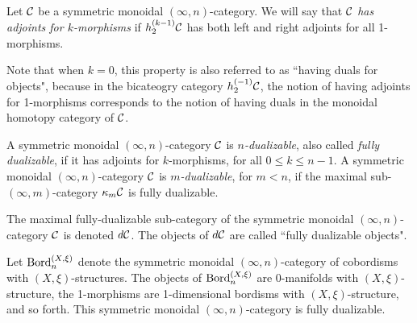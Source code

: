 \documentclass[a4paper]{amsart}
\begin{document}
\begin{definition}
	Let $\mathcal C$ be a symmetric monoidal $(\infty,n)$-category. We will say that $\mathcal C$ {\em has adjoints for $k$-morphisms} if $h^{(k-1)}_2 \mathcal C$ has both left and right adjoints for all 1-morphisms. 
\end{definition}

\noindent Note that when $k=0$, this property is also referred to as ``having duals for objects", because in the bicateogry category $h^{(-1)}_2 \mathcal C$, the notion of having adjoints for 1-morphisms corresponds to the notion of having duals in the monoidal homotopy category of $\mathcal C$.

\begin{definition}
A symmetric monoidal $(\infty,n)$-category $\mathcal C$ is \emph{$n$-dualizable}, also called
\emph{fully dualizable}, if it has adjoints for $k$-morphisms, for all $0 \leq k \leq n-1$.
A symmetric monoidal $(\infty,n)$-category $\mathcal C$ is \emph{$m$-dualizable}, for $m<n$, if the maximal sub-$(\infty,m)$-category $\kappa_m \mathcal C$ is fully dualizable.
\end{definition} 



\noindent The maximal fully-dualizable sub-category of the symmetric monoidal $(\infty,n)$-category $\mathcal C$ is denoted $d\mathcal C$. The objects of $d\mathcal C$ are called ``fully dualizable objects". 

\begin{example}
	Let $\mathrm{Bord}^{(X,\xi)}_n$ denote the symmetric monoidal $(\infty,n)$-category of cobordisms with $(X,\xi)$-structures. The objects of $\mathrm{Bord}^{(X,\xi)}_n$ are 0-manifolds with $(X, \xi)$-structure, the 1-morphisms are 1-dimensional bordisms with $(X,\xi)$-structure, and so forth. This symmetric monoidal $(\infty,n)$-category is fully dualizable. 
\end{example}
\end{document}
